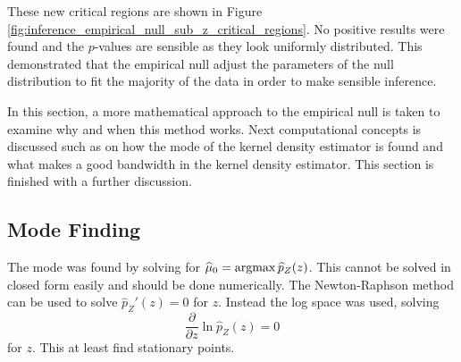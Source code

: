 These new critical regions are shown in Figure \ref{fig:inference_empirical_null_sub_z_critical_regions}. No positive results were found and the $p$-values are sensible as they look uniformly distributed. This demonstrated that the empirical null adjust the parameters of the null distribution to fit the majority of the data in order to make sensible inference.

In this section, a more mathematical approach to the empirical null is taken to examine why and when this method works. Next computational concepts is discussed such as on how the mode of the kernel density estimator is found and what makes a good bandwidth in the kernel density estimator. This section is finished with a further discussion.

\subsection{Mode Finding}

The mode was found by solving for $\widehat{\mu}_0 = \operatorname*{argmax}\widehat{p}_Z(z)$. This cannot be solved in closed form easily and should be done numerically. The  Newton-Raphson method can be used to solve $\hat{p}_Z'(z) = 0$ for $z$. Instead the log space was used, solving
\begin{equation}
  \dfrac{
    \partial
  }
  {
    \partial z
  }
  \ln\widehat{p}_Z(z)
  = 0
\end{equation}
for $z$. This at least find stationary points.

